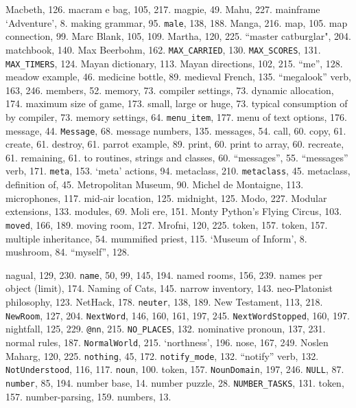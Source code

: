 Macbeth, 126.
macram{ e} bag, 105, 217.
magpie, 49.
Mahu, 227.
mainframe `Adventure', 8.
making grammar, 95.
{{\tt male}}, 138, 188.
Manga, 216.
map, 105.
map connection, 99.
Marc Blank, 105, 109.
Martha, 120, 225.
``master catburglar", 204.
matchbook, 140.
Max Beerbohm, 162.
{{\tt MAX\_CARRIED}}, 130.
{{\tt MAX\_SCORES}}, 131.
{{\tt MAX\_TIMERS}}, 124.
Mayan dictionary, 113.
Mayan directions, 102, 215.
``me'', 128.
meadow example, 46.
medicine bottle, 89.
medieval French, 135.
``megalook'' verb, 163, 246.
members, 52.
memory, 73.
\quad  compiler settings, 73.
\quad  dynamic allocation, 174.
\quad  maximum size of game, 173.
\quad  small, large or huge, 73.
\quad  typical consumption of by compiler, 73.
memory settings, 64.
{{\tt menu\_item}}, 177.
menu of text options, 176.
message, 44.
{{\tt Message}}, 68.
message numbers, 135.
messages, 54.
\quad  call, 60.
\quad  copy, 61.
\quad  create, 61.
\quad  destroy, 61.
\quad  parrot example, 89.
\quad  print, 60.
\quad  print to array, 60.
\quad  recreate, 61.
\quad  remaining, 61.
\quad  to routines, strings and classes, 60.
``messages'', 55.
``messages'' verb, 171.
{{\tt meta}}, 153.
`meta' actions, 94.
metaclass, 210.
{{\tt metaclass}}, 45.
metaclass, definition of, 45.
Metropolitan Museum, 90.
Michel de Montaigne, 113.
microphones, 117.
mid-air location, 125.
midnight, 125.
Modo, 227.
Modular extensions, 133.
modules, 69.
Moli{ e}re, 151.
Monty Python's Flying Circus, 103.
{{\tt moved}}, 166, 189.
moving room, 127.
Mrofni, 120, 225.
 token, 157.
 token, 157.
multiple inheritance, 54.
mummified priest, 115.
`Museum of Inform', 8.
mushroom, 84.
``myself'', 128.

nagual, 129, 230.
{{\tt name}}, 50, 99, 145, 194.
named rooms, 156, 239.
names per object (limit), 174.
Naming of Cats, 145.
narrow inventory, 143.
neo-Platonist philosophy, 123.
NetHack, 178.
{{\tt neuter}}, 138, 189.
New Testament, 113, 218.
{{\tt NewRoom}}, 127, 204.
{{\tt NextWord}}, 146, 160, 161, 197, 245.
{{\tt NextWordStopped}}, 160, 197.
nightfall, 125, 229.
{{\tt @nn}}, 215.
{{\tt NO\_PLACES}}, 132.
nominative pronoun, 137, 231.
normal rules, 187.
{{\tt NormalWorld}}, 215.
`northness', 196.
nose, 167, 249.
Noslen Maharg, 120, 225.
{{\tt nothing}}, 45, 172.
{{\tt notify\_mode}}, 132.
``notify'' verb, 132.
{{\tt NotUnderstood}}, 116, 117.
{{\tt noun}}, 100.
 token, 157.
{{\tt NounDomain}}, 197, 246.
{{\tt NULL}}, 87.
{{\tt number}}, 85, 194.
number base, 14.
number puzzle, 28.
{{\tt NUMBER\_TASKS}}, 131.
 token, 157.
number-parsing, 159.
numbers, 13.

